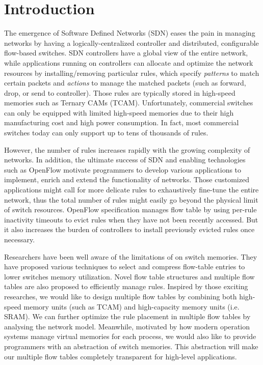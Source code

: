 \documentclass[10pt,twocolumn,letterpaper]{article}
\begin{document}
\section{Introduction}\label{sec:1}
The emergence of Software Defined Networks (SDN)\cite{mendonca2013survey} eases the pain in managing networks by having a logically-centralized controller and distributed, configurable flow-based switches. SDN controllers have a global view of the entire network, while applications running on controllers can allocate and optimize the network resources by installing/removing particular rules, which specify  \textit{patterns} to match certain packets and \textit{actions} to manage the matched packets (such as forward, drop, or send to controller). Those rules are typically stored in high-speed memories such as Ternary CAMs (TCAM). Unfortunately, commercial switches can only be equipped with limited high-speed memories due to their high manufacturing cost and high power consumption. In fact, most commercial switches today can only support up to tens of thousands of rules\cite{nakagawa2013domainflow,stephens2012past}.

However, the number of rules increases rapidly with the growing complexity of networks. In addition, the ultimate success of SDN and enabling technologies such as OpenFlow\cite{mckeown2008openflow} motivate programmers to develop various applications to implement, enrich and extend the functionality of networks. Those customized applications might call for more delicate rules to exhaustively fine-tune the entire network, thus the total number of rules might easily go beyond the physical limit of switch resources. OpenFlow specification manages flow table by using per-rule inactivity timeouts to evict rules when they have not been recently accessed\cite{zarek2012openflow}. But it also increases the burden of controllers to install previously evicted rules once necessary.

Researchers have been well aware of the limitations of on switch memories. They have proposed various techniques to select and compress flow-table entries to lower switches memory utilization\cite{curtis2011devoflow,nguyen2014optimizing,yu2010scalable}. Novel flow table structures and multiple flow tables are also proposed to efficiently manage rules\cite{nakagawa2013domainflow}. Inspired by those exciting researches, we would like to design multiple flow tables by combining both high-speed memory units (such as TCAM) and high-capacity memory units (i.e. SRAM). We can further optimize the rule placement in multiple flow tables by analysing the network model. Meanwhile, motivated by how modern operation systems manage virtual memories for each process, we would also like to provide programmers with an abstraction of switch memories. This abstraction will make our multiple flow tables completely transparent for high-level applications.
\end{document}
